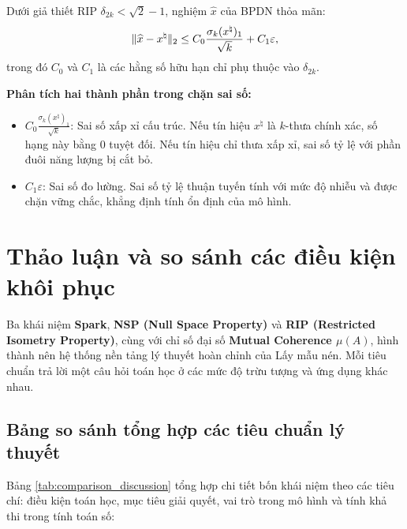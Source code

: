\begin{theorem}
Dưới giả thiết RIP $\delta_{2k} < \sqrt{2} - 1$, nghiệm $\widehat{x}$ của BPDN thỏa mãn:
\begin{equation}
    \|\widehat{x} - x^\natural\|_2 \le C_0 \frac{\sigma_k(x^\natural)_1}{\sqrt{k}} + C_1 \varepsilon,
    \label{eq:bpdn_error_bound}
\end{equation}
trong đó $C_0$ và $C_1$ là các hằng số hữu hạn chỉ phụ thuộc vào $\delta_{2k}$.
\end{theorem}

\textbf{Phân tích hai thành phần trong chặn sai số:}
\begin{itemize}
    \item $C_0 \frac{\sigma_k(x^\natural)_1}{\sqrt{k}}$: Sai số xấp xỉ cấu trúc. Nếu tín hiệu $x^\natural$ là $k$-thưa chính xác, số hạng này bằng 0 tuyệt đối. Nếu tín hiệu chỉ thưa xấp xỉ, sai số tỷ lệ với phần đuôi năng lượng bị cắt bỏ.
    \item $C_1 \varepsilon$: Sai số đo lường. Sai số tỷ lệ thuận tuyến tính với mức độ nhiễu và được chặn vững chắc, khẳng định tính ổn định của mô hình.
\end{itemize}

\section{Thảo luận và so sánh các điều kiện khôi phục}
\label{sec:thao_luan_so_sanh}

Ba khái niệm \textbf{Spark}, \textbf{NSP (Null Space Property)} và \textbf{RIP (Restricted Isometry Property)}, cùng với chỉ số đại số \textbf{Mutual Coherence $\mu(A)$}, hình thành nên hệ thống nền tảng lý thuyết hoàn chỉnh của Lấy mẫu nén. Mỗi tiêu chuẩn trả lời một câu hỏi toán học ở các mức độ trừu tượng và ứng dụng khác nhau.

\subsection{Bảng so sánh tổng hợp các tiêu chuẩn lý thuyết}
Bảng \ref{tab:comparison_discussion} tổng hợp chi tiết bốn khái niệm theo các tiêu chí: điều kiện toán học, mục tiêu giải quyết, vai trò trong mô hình và tính khả thi trong tính toán số:

